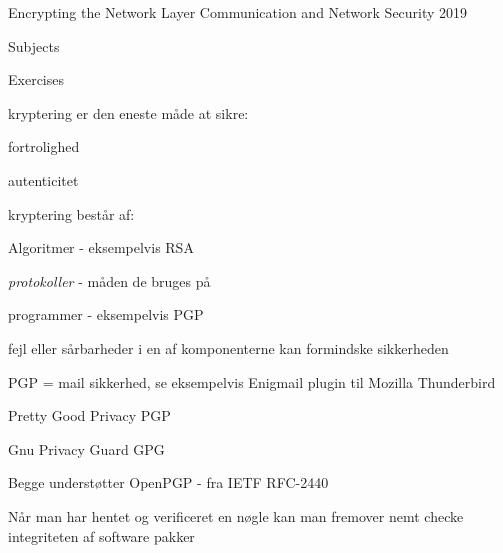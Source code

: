 \documentclass[Screen16to9,17pt]{foils}
\begin{document}
\mytitlepage
{Encrypting the Network Layer}
{Communication and Network Security 2019}




\begin{list1}
\item Subjects
\begin{list2}
\item
\end{list2}
\item Exercises
\begin{list2}
\item
\end{list2}
\end{list1}



\begin{list1}
  \item kryptering er den eneste måde at sikre:
    \begin{list2}
      \item fortrolighed
      \item autenticitet
    \end{list2}
\item kryptering består af:
  \begin{list2}
    \item Algoritmer - eksempelvis RSA
    \item \emph{protokoller} - måden de bruges på
\item programmer - eksempelvis PGP
\end{list2}
\item fejl eller sårbarheder i en af komponenterne kan formindske
  sikkerheden
\item PGP = mail sikkerhed, se eksempelvis Enigmail plugin til Mozilla Thunderbird

\end{list1}


\begin{list1}
\item Pretty Good Privacy PGP
\item Gnu Privacy Guard GPG
\item Begge understøtter OpenPGP - fra IETF RFC-2440
\item Når man har hentet og verificeret en nøgle kan man fremover nemt
checke integriteten af software pakker
\end{list1}
\end{document}
